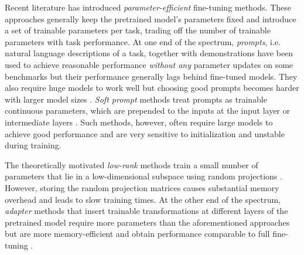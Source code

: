 \documentclass{article}
\begin{document}
Recent literature has introduced \emph{parameter-efficient} fine-tuning methods. These approaches generally keep the pretrained model's parameters fixed and introduce a set of trainable parameters per task, trading off the number of trainable parameters with task performance. At one end of the spectrum, \emph{prompts}, i.e. natural language descriptions of a task, together with demonstrations have been used to achieve reasonable performance \emph{without any} parameter updates on some benchmarks \citep{brown2020gpt3} but their performance generally lags behind fine-tuned models. They also require huge models to work well but choosing good prompts becomes harder with larger model sizes \citep{Perez2021true}. \emph{Soft prompt} methods treat prompts as trainable continuous parameters, which are prepended to the inputs at the input layer or intermediate layers \citep{li2021prefix,hambardzumyan2021warp,lester2021power}. Such methods, however, often require large models to achieve good performance and are very sensitive to initialization and unstable during training. 

The theoretically motivated \emph{low-rank} methods train a small number of parameters that lie in a low-dimensional subspace using random projections \citep{li2018measuring,aghajanyan2020intrinsic}. However, storing the random projection matrices causes substantial memory overhead and leads to slow training times.
At the other end of the spectrum, \emph{adapter} methods \citep{rebuffi2018efficient, houlsby2019parameter} that insert trainable transformations at different layers of the pretrained model require more parameters than the aforementioned approaches but are more memory-efficient and obtain performance comparable to full fine-tuning \citep{houlsby2019parameter, linz-etal-2020-exploring}.
\end{document}
